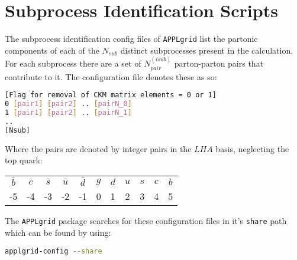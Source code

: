\documentclass[11pt]{article}
\newcommand{\appl} {{\tt APPLgrid}\xspace}
\begin{document}
\clearpage
\appendix
\section{Subprocess Identification Scripts}
The subprocess identification config files of \appl list the partonic components of each of the $N_{sub}$ distinct subprocesses present in the calculation. For each subprocess there are a set of $N_{pair}^{(isub)}$ parton-parton pairs that contribute to it. The configuration file denotes these as so:

\begin{lstlisting}[language=bash]
[Flag for removal of CKM matrix elements = 0 or 1]
0 [pair1] [pair2] .. [pairN_0]
1 [pair1] [pair2] .. [pairN_1]
..
[Nsub]  
\end{lstlisting}
Where the pairs are denoted by integer pairs in the $LHA$ basis, neglecting the top quark:\\
\begin{table}[h]
\centering
\begin{tabular}{c c c c c c c c c c c }
  $\bar{b}$ & $\bar{c}$ & $\bar{s}$ & $\bar{u}$ & $\bar{d}$ & $g$ & $d$ & $u$ & $s$ & $c$ & $b$ \\
  -5 & -4 & -3 & -2 & -1 & 0 & 1 & 2 & 3 & 4 & 5 \\
\end{tabular}
\end{table}

The \appl package searches for these configuration files in it's \lstinline[language=bash]{share} path which can be found by using:
\begin{lstlisting}[language=bash]
applgrid-config --share
\end{lstlisting}
\end{document}
